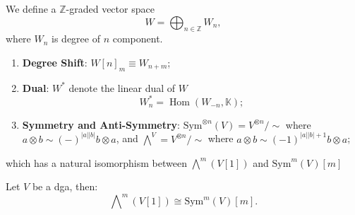 \documentclass[10pt]{article}
\newcommand{\Hom}{\operatorname{Hom}}
\begin{document}
We define a $ \mathbb{Z}$-graded vector space
\begin{equation*}
  W = \bigoplus_{n \in \mathbb{Z}} W_{n},
\end{equation*}
where $ W_{n}$ is degree of $ n$ component.
\begin{enumerate}
  \item \textbf{Degree Shift}: $ W[n]_{m} \equiv W_{n+m}$;
  \item \textbf{Dual}: $ W^{*}$ denote the linear dual of $ W$
    \begin{equation*}
      W^{*}_{n} = \Hom(W_{-n}, \mathbb{K});
    \end{equation*}
  \item \textbf{Symmetry and Anti-Symmetry}: $ \mathrm{Sym}^{\otimes n}(V) = V^{\otimes n} / \sim $ where $a \otimes b \sim (-)^{|a||b|} b \otimes a$,
    and $ \bigwedge\nolimits^{V} = V^{\otimes n} / \sim $ where $ a \otimes b \sim (-1)^{|a||b|+1} b \otimes a$;
\end{enumerate}
which has a natural isomorphism between $\bigwedge\nolimits^{m} \left( V[1] \right) $ and $\mathrm{Sym}^{m} (V)[m]$
\begin{proposition}
  Let $ V$ be a dga, then:
  \begin{equation*}
    \bigwedge\nolimits^{m} \left( V[1] \right) \cong \mathrm{Sym}^{m} (V)[m].
  \end{equation*}
\end{proposition}
\end{document}

